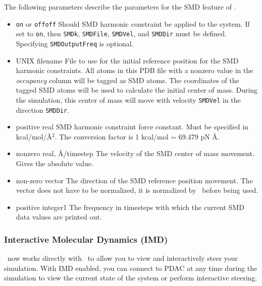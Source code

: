 The following parameters describe the parameters for the 
SMD feature of \PDAC.
\begin{itemize}
\item 
{}
{{\tt on} or {\tt off}}{{\tt off}}
{Should SMD harmonic constraint be applied to the system. If set 
to {\tt on}, then  {\tt SMDk}, {\tt SMDFile}, {\tt SMDVel}, and
{\tt SMDDir} must be defined.  Specifying {\tt SMDOutputFreq} 
is optional.}

\item
{}
{UNIX filename} {File to use for the initial reference position for the SMD
harmonic constraints.  All atoms in this PDB file with a nonzero value in the
{\em occupancy} column will be tagged as SMD atoms.  The coordinates of the
tagged SMD atoms will be used to calculate the initial center of mass.
During the simulation, this center of mass will move with velocity
{\tt SMDVel} in the direction {\tt SMDDir}.}

\item
{}
{positive real}
{SMD harmonic constraint force constant. Must be specified in
kcal/mol/\AA$^2$. The conversion factor is 1 kcal/mol = 69.479 pN \AA.} 

\item
{}
{nonzero real, \AA/timestep}
{The velocity of the SMD center of mass movement. Gives the absolute
value.}

\item
{}
{non-zero vector}
{The direction of the SMD reference position movement. The vector does
not have to be normalized, it is normalized by \PDAC\ before being used.}

\item
{}
{positive integer}{1} {The frequency in timesteps with which the
current SMD data values are printed out.}
\end{itemize}


\subsubsection{Interactive Molecular Dynamics (IMD)}

\PDAC\ now works directly with \VMD\ to allow you to view and interactively
steer your simulation.  With IMD enabled, you can connect to PDAC at any
time during the simulation to view the current state of the system or perform
interactive steering. 

